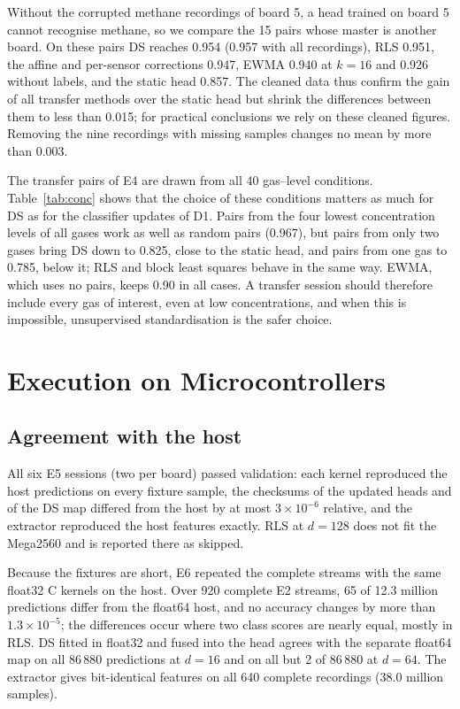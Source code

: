 \documentclass[journal,twoside,web]{ieeecolor}
\begin{document}
Without the corrupted methane recordings of board 5, a head trained on board 5 cannot recognise methane, so we compare the 15 pairs whose master is another board. On these pairs DS reaches 0.954 (0.957 with all recordings), RLS 0.951, the affine and per-sensor corrections 0.947, EWMA 0.940 at $k=16$ and 0.926 without labels, and the static head 0.857. The cleaned data thus confirm the gain of all transfer methods over the static head but shrink the differences between them to less than 0.015; for practical conclusions we rely on these cleaned figures. Removing the nine recordings with missing samples changes no mean by more than 0.003.



The transfer pairs of E4 are drawn from all 40 gas--level conditions. Table~\ref{tab:conc} shows that the choice of these conditions matters as much for DS as for the classifier updates of D1. Pairs from the four lowest concentration levels of all gases work as well as random pairs (0.967), but pairs from only two gases bring DS down to 0.825, close to the static head, and pairs from one gas to 0.785, below it; RLS and block least squares behave in the same way. EWMA, which uses no pairs, keeps 0.90 in all cases. A transfer session should therefore include every gas of interest, even at low concentrations, and when this is impossible, unsupervised standardisation is the safer choice.

\section{Execution on Microcontrollers}
\subsection{Agreement with the host}
All six E5 sessions (two per board) passed validation: each kernel reproduced the host predictions on every fixture sample, the checksums of the updated heads and of the DS map differed from the host by at most $3\times10^{-6}$ relative, and the extractor reproduced the host features exactly. RLS at $d=128$ does not fit the Mega2560 and is reported there as skipped.

Because the fixtures are short, E6 repeated the complete streams with the same float32 C kernels on the host. Over 920 complete E2 streams, 65 of 12.3 million predictions differ from the float64 host, and no accuracy changes by more than $1.3\times10^{-5}$; the differences occur where two class scores are nearly equal, mostly in RLS. DS fitted in float32 and fused into the head agrees with the separate float64 map on all 86\,880 predictions at $d=16$ and on all but 2 of 86\,880 at $d=64$. The extractor gives bit-identical features on all 640 complete recordings (38.0 million samples).
\end{document}
